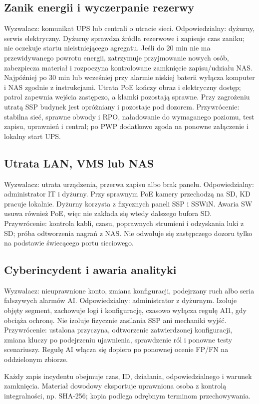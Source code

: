 \subsection*{Zanik energii i wyczerpanie rezerwy}
Wyzwalacz: komunikat UPS lub centrali o utracie sieci. Odpowiedzialny: dyżurny, serwis elektryczny. Dyżurny sprawdza źródła rezerwowe i zapisuje czas zaniku; nie oczekuje startu nieistniejącego agregatu. Jeśli do 20 min nie ma przewidywanego powrotu energii, zatrzymuje przyjmowanie nowych osób, zabezpiecza materiał i rozpoczyna kontrolowane zamknięcie zapisu/udziału NAS. Najpóźniej po 30 min lub wcześniej przy alarmie niskiej baterii wyłącza komputer i NAS zgodnie z instrukcjami. Utrata PoE kończy obraz i elektryczny dostęp; patrol zapewnia wejścia zastępczo, a klamki pozostają sprawne. Przy zagrożeniu utratą SSP budynek jest opróżniany i pozostaje pod dozorem. Przywrócenie: stabilna sieć, sprawne obwody i RPO, naładowanie do wymaganego poziomu, test zapisu, uprawnień i central; po PWP dodatkowo zgoda na ponowne załączenie i lokalny start UPS.

\subsection*{Utrata LAN, VMS lub NAS}
Wyzwalacz: utrata urządzenia, przerwa zapisu albo brak panelu. Odpowiedzialny: administrator IT i dyżurny. Przy sprawnym PoE kamery przechodzą na SD, KD pracuje lokalnie. Dyżurny korzysta z fizycznych paneli SSP i SSWiN. Awaria SW usuwa również PoE, więc nie zakłada się wtedy dalszego bufora SD. Przywrócenie: kontrola kabli, czasu, poprawnych strumieni i odzyskania luki z SD; próba odtworzenia nagrań z NAS. Nie odwołuje się zastępczego dozoru tylko na podstawie świecącego portu sieciowego.

\subsection*{Cyberincydent i awaria analityki}
Wyzwalacz: nieuprawnione konto, zmiana konfiguracji, podejrzany ruch albo seria fałszywych alarmów AI. Odpowiedzialny: administrator z dyżurnym. Izoluje objęty segment, zachowuje logi i konfigurację, czasowo wyłącza regułę AI1, gdy obciąża ochronę. Nie izoluje fizycznie zasilania SSP ani mechaniki wyjść. Przywrócenie: ustalona przyczyna, odtworzenie zatwierdzonej konfiguracji, zmiana kluczy po podejrzeniu ujawnienia, sprawdzenie ról i ponowne testy scenariuszy. Regułę AI włącza się dopiero po ponownej ocenie FP/FN na oddzielonym zbiorze.

Każdy zapis incydentu obejmuje czas, ID, działania, odpowiedzialnego i warunek zamknięcia. Materiał dowodowy eksportuje uprawniona osoba z kontrolą integralności, np. SHA-256; kopia podlega odrębnym terminom przechowywania.
